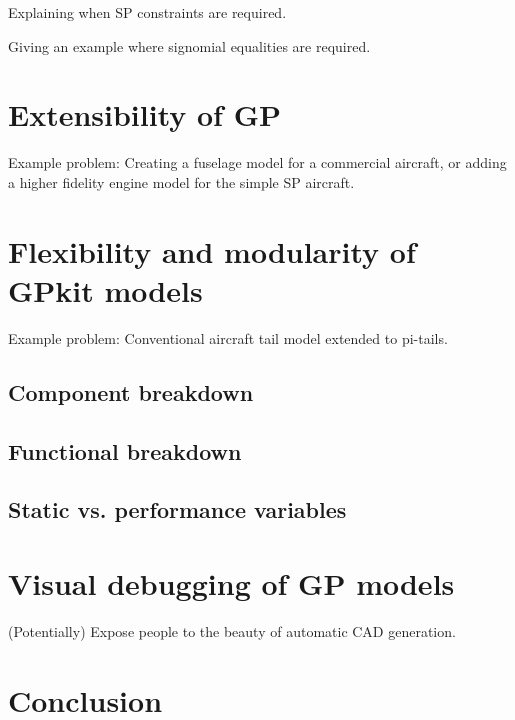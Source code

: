\documentclass{aiaa-pretty}
\begin{document}
Explaining when \gls{SP} constraints are required. 

Giving an example where signomial equalities are required. 

\section{Extensibility of \gls{GP}}

Example problem: Creating a fuselage model for a commercial aircraft, or adding a higher fidelity engine model for the simple SP aircraft. 

\section{Flexibility and modularity of GPkit models}

Example problem: Conventional aircraft tail model extended to pi-tails. 

\subsection{Component breakdown}

\subsection{Functional breakdown}

\subsection{Static vs. performance variables}

\section{Visual debugging of \gls{GP} models}

(Potentially) Expose people to the beauty of automatic CAD generation. 

\section{Conclusion}
\end{document}
